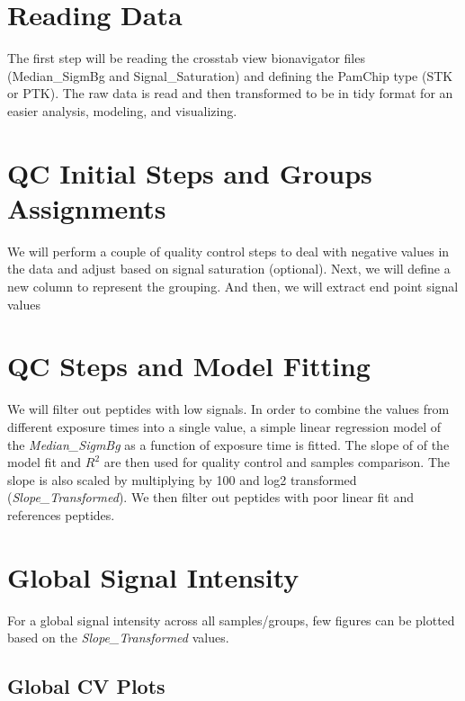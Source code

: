 \documentclass[
  letterpaper,
  DIV=11,
  numbers=noendperiod]{scrreport}
\begin{document}
\hypertarget{reading-data}{%
\section{Reading Data}\label{reading-data}}

The first step will be reading the crosstab view bionavigator files
(Median\_SigmBg and Signal\_Saturation) and defining the PamChip type
(STK or PTK). The raw data is read and then transformed to be in tidy
format for an easier analysis, modeling, and visualizing.

\hypertarget{qc-initial-steps-and-groups-assignments}{%
\section{QC Initial Steps and Groups
Assignments}\label{qc-initial-steps-and-groups-assignments}}

We will perform a couple of quality control steps to deal with negative
values in the data and adjust based on signal saturation (optional).
Next, we will define a new column to represent the grouping. And then,
we will extract end point signal values

\hypertarget{qc-steps-and-model-fitting}{%
\section{QC Steps and Model Fitting}\label{qc-steps-and-model-fitting}}

We will filter out peptides with low signals. In order to combine the
values from different exposure times into a single value, a simple
linear regression model of the \emph{Median\_SigmBg} as a function of
exposure time is fitted. The slope of of the model fit and \(R^2\) are
then used for quality control and samples comparison. The slope is also
scaled by multiplying by 100 and log2 transformed
(\emph{Slope\_Transformed}). We then filter out peptides with poor
linear fit and references peptides.

\hypertarget{global-signal-intensity}{%
\section{Global Signal Intensity}\label{global-signal-intensity}}

For a global signal intensity across all samples/groups, few figures can
be plotted based on the \emph{Slope\_Transformed} values.

\hypertarget{global-cv-plots}{%
\subsection{Global CV Plots}\label{global-cv-plots}}
\end{document}
